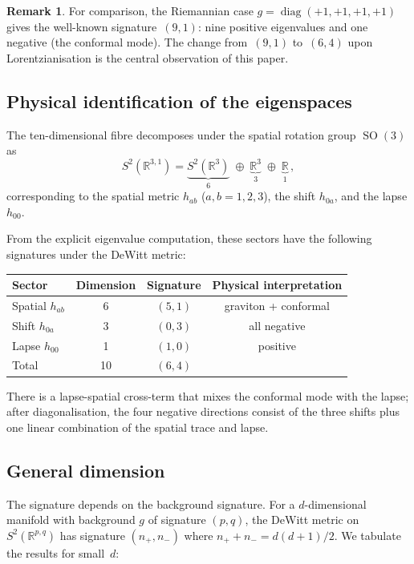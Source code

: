 \documentclass[12pt,a4paper]{article}
\theoremstyle{definition}
\newtheorem{remark}[theorem]{Remark}
\newcommand{\SO}{\operatorname{SO}}
\newcommand{\diag}{\operatorname{diag}}
\newcommand{\R}{\mathbb{R}}
\begin{document}
\begin{remark}
For comparison, the Riemannian case $g = \diag(+1,+1,+1,+1)$ gives the well-known signature~$(9,1)$: nine positive eigenvalues and one negative (the conformal mode).
The change from~$(9,1)$ to~$(6,4)$ upon Lorentzianisation is the central observation of this paper.
\end{remark}

\subsection{Physical identification of the eigenspaces}

The ten-dimensional fibre decomposes under the spatial rotation group $\SO(3)$ as
\begin{equation}
S^2(\R^{3,1}) = \underbrace{S^2(\R^3)}_{6} \;\oplus\; \underbrace{\R^3}_{3} \;\oplus\; \underbrace{\R}_{1}\,,
\end{equation}
corresponding to the spatial metric $h_{ab}$ ($a,b = 1,2,3$), the shift $h_{0a}$, and the lapse $h_{00}$.

From the explicit eigenvalue computation, these sectors have the following signatures under the DeWitt metric:

\begin{center}
\begin{tabular}{lccc}
\toprule
Sector & Dimension & Signature & Physical interpretation \\
\midrule
Spatial $h_{ab}$ & 6 & $(5,1)$ & graviton + conformal \\
Shift $h_{0a}$ & 3 & $(0,3)$ & all negative \\
Lapse $h_{00}$ & 1 & $(1,0)$ & positive \\
\midrule
Total & 10 & $(6,4)$ & \\
\bottomrule
\end{tabular}
\end{center}

\noindent
There is a lapse-spatial cross-term that mixes the conformal mode with the lapse; after diagonalisation, the four negative directions consist of the three shifts plus one linear combination of the spatial trace and lapse.

\subsection{General dimension}

The signature depends on the background signature.
For a $d$-dimensional manifold with background $g$ of signature $(p,q)$, the DeWitt metric on $S^2(\R^{p,q})$ has signature $(n_+, n_-)$ where $n_+ + n_- = d(d+1)/2$.
We tabulate the results for small~$d$:
\end{document}

